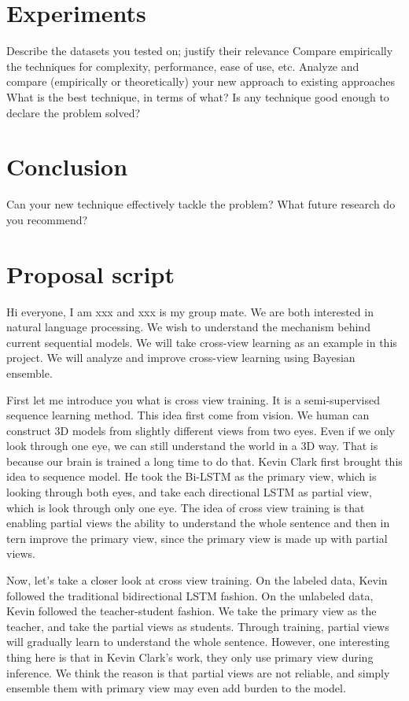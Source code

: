 \documentclass{article}
\begin{document}

\section{Experiments}
Describe the datasets you tested on; justify their relevance
Compare empirically the techniques for complexity, performance, ease of use, etc.
Analyze and compare (empirically or theoretically) your new approach to existing approaches
What is the best technique, in terms of what?
 Is any technique good enough to declare the problem solved?
 
\section{Conclusion}
Can your new technique effectively tackle the problem?
What future research do you recommend?
\newpage

\section{Proposal script}

Hi everyone, I am xxx and xxx is my group mate. We are both interested in natural language processing. We wish to understand the mechanism behind current sequential models. We will take cross-view learning as an example in this project. We will analyze and improve cross-view learning using Bayesian ensemble.

First let me introduce you what is cross view training. It is a semi-supervised sequence learning method. This idea first come from vision. We human can construct 3D models from slightly different views from two eyes. Even if we only look through one eye, we can still understand the world in a 3D way. That is because our brain is trained a long time to do that. Kevin Clark first brought this idea to sequence model. He took the Bi-LSTM as the primary view, which is looking through both eyes, and take each directional LSTM as partial view, which is look through only one eye. The idea of cross view training is that enabling partial views the ability to understand the whole sentence and then in tern improve the primary view, since the primary view is made up with partial views.

Now, let’s take a closer look at cross view training. On the labeled data, Kevin followed the traditional bidirectional LSTM fashion. On the unlabeled data, Kevin followed the teacher-student fashion. We take the primary view as the teacher, and take the partial views as students. Through training, partial views will gradually learn to understand the whole sentence. However, one interesting thing here is that  in Kevin Clark’s work, they only use primary view during inference. We think the reason is that partial views are not reliable, and simply ensemble them with primary view may even add burden to the model.
\end{document}
